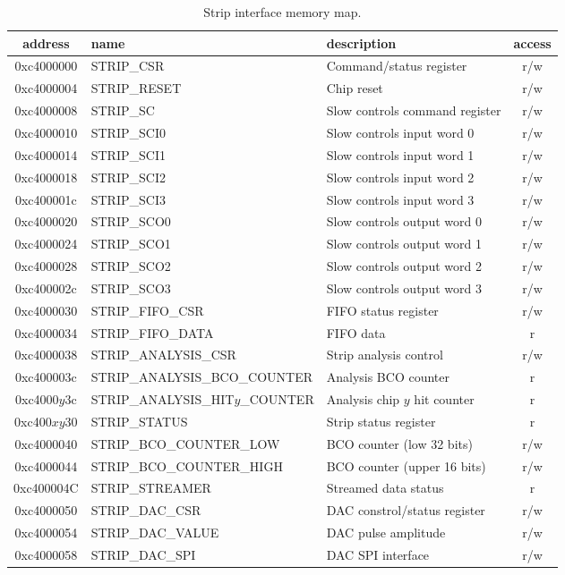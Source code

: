 \documentclass[11pt]{article}
\begin{document}
\begin{table}
\begin{center}
\small
\begin{tabular}{|c|l|l|c|} \hline
address & name & description & access \\ \hline\hline
0xc4000000 & STRIP\_CSR & Command/status register & r/w \\ \hline
0xc4000004 & STRIP\_RESET & Chip reset & r/w \\ \hline
0xc4000008 & STRIP\_SC & Slow controls command register & r/w  \\ \hline
0xc4000010 & STRIP\_SCI0 & Slow controls input word 0 & r/w  \\ \hline
0xc4000014 & STRIP\_SCI1 & Slow controls input word 1 & r/w  \\ \hline
0xc4000018 & STRIP\_SCI2 & Slow controls input word 2 & r/w  \\ \hline
0xc400001c & STRIP\_SCI3 & Slow controls input word 3  & r/w  \\ \hline
0xc4000020 & STRIP\_SCO0 & Slow controls output word 0 & r/w  \\ \hline
0xc4000024 & STRIP\_SCO1 & Slow controls output word 1 & r/w  \\ \hline
0xc4000028 & STRIP\_SCO2 & Slow controls output word 2 & r/w  \\ \hline
0xc400002c & STRIP\_SCO3 & Slow controls output word 3 & r/w  \\ \hline
0xc4000030 & STRIP\_FIFO\_CSR & FIFO status register & r/w \\ \hline
0xc4000034 & STRIP\_FIFO\_DATA & FIFO data & r \\ \hline
0xc4000038 & STRIP\_ANALYSIS\_CSR & Strip analysis control & r/w \\ \hline 
0xc400003c & STRIP\_ANALYSIS\_BCO\_COUNTER & Analysis BCO counter & r \\ \hline 
0xc4000$y$3c & STRIP\_ANALYSIS\_HIT$y$\_COUNTER & Analysis chip $y$ hit counter & r \\ \hline 
0xc400$xy$30 & STRIP\_STATUS & Strip status register & r \\ \hline
0xc4000040 & STRIP\_BCO\_COUNTER\_LOW & BCO counter (low 32 bits) & r/w \\ \hline 
0xc4000044 & STRIP\_BCO\_COUNTER\_HIGH & BCO counter (upper 16 bits) & r/w \\ \hline 
0xc400004C & STRIP\_STREAMER & Streamed data status & r \\ \hline 
0xc4000050 & STRIP\_DAC\_CSR & DAC constrol/status register & r/w \\ \hline 
0xc4000054 & STRIP\_DAC\_VALUE & DAC pulse amplitude & r/w \\ \hline 
0xc4000058 & STRIP\_DAC\_SPI & DAC SPI interface & r/w \\ \hline 
\end{tabular}
\end{center}
  \caption{\label{tab-stripmmr}Strip interface memory map.}
\end{table}
\end{document}
